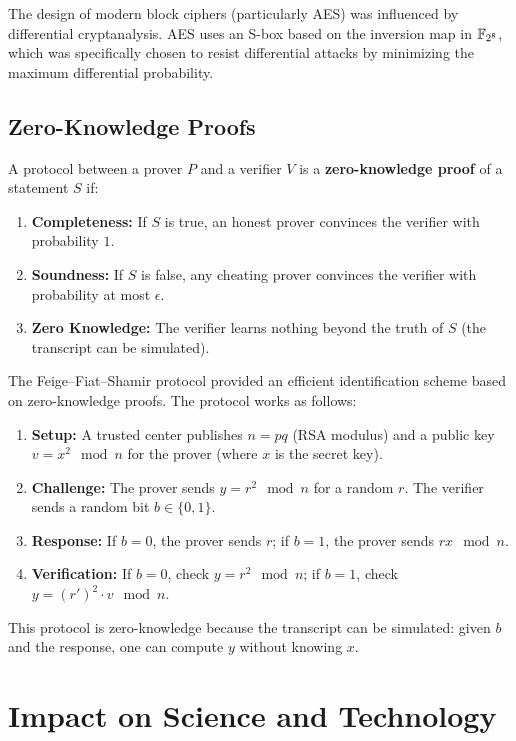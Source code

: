 The design of modern block ciphers (particularly AES) was influenced by differential cryptanalysis. AES uses an S-box based on the inversion map in $\mathbb{F}_{2^8}$, which was specifically chosen to resist differential attacks by minimizing the maximum differential probability.

\subsection{Zero-Knowledge Proofs}

\begin{definition}
A protocol between a prover $P$ and a verifier $V$ is a \textbf{zero-knowledge proof} of a statement $S$ if:
\begin{enumerate}
    \item \textbf{Completeness:} If $S$ is true, an honest prover convinces the verifier with probability $1$.
    \item \textbf{Soundness:} If $S$ is false, any cheating prover convinces the verifier with probability at most $\epsilon$.
    \item \textbf{Zero Knowledge:} The verifier learns nothing beyond the truth of $S$ (the transcript can be simulated).
\end{enumerate}
\end{definition}

The Feige--Fiat--Shamir protocol provided an efficient identification scheme based on zero-knowledge proofs. The protocol works as follows:
\begin{enumerate}
    \item \textbf{Setup:} A trusted center publishes $n = pq$ (RSA modulus) and a public key $v = x^2 \mod n$ for the prover (where $x$ is the secret key).
    \item \textbf{Challenge:} The prover sends $y = r^2 \mod n$ for a random $r$. The verifier sends a random bit $b \in \{0, 1\}$.
    \item \textbf{Response:} If $b = 0$, the prover sends $r$; if $b = 1$, the prover sends $rx \mod n$.
    \item \textbf{Verification:} If $b = 0$, check $y = r^2 \mod n$; if $b = 1$, check $y = (r' )^2 \cdot v \mod n$.
\end{enumerate}

This protocol is zero-knowledge because the transcript can be simulated: given $b$ and the response, one can compute $y$ without knowing $x$.

\section{Impact on Science and Technology}

